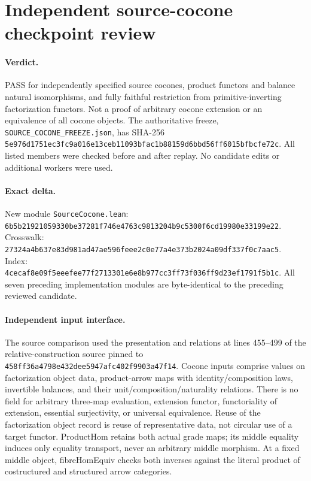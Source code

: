 \documentclass{article}
\begin{document}
\section*{Independent source-cocone checkpoint review}
\paragraph{Verdict.} PASS for independently specified source cocones, product functors and balance natural isomorphisms, and fully faithful restriction from primitive-inverting factorization functors. Not a proof of arbitrary cocone extension or an equivalence of all cocone objects. The authoritative freeze, \texttt{SOURCE\_COCONE\_FREEZE.json}, has SHA-256 \texttt{5e976d1751ec3fc9a016e13ceb11093bfac1b88159d6bbd56ff6015bfbcfe72c}. All listed members were checked before and after replay. No candidate edits or additional workers were used.
\paragraph{Exact delta.} New module \texttt{SourceCocone.lean}: \texttt{6b5b21921059330be37281f746e4763c9813204b9c5300f6cd19980e33199e22}. Crosswalk: \texttt{27324a4b637e83d981ad47ae596feee2c0e77a4e373b2024a09df337f0c7aac5}. Index: \texttt{4cecaf8e09f5eeefee77f2713301e6e8b977cc3ff73f036ff9d23ef1791f5b1c}. All seven preceding implementation modules are byte-identical to the preceding reviewed candidate.
\paragraph{Independent input interface.} The source comparison used the presentation and relations at lines 455--499 of the relative-construction source pinned to \texttt{458ff36a4798e432dee5947afc402f9903a47f14}. Cocone inputs comprise values on factorization object data, product-arrow maps with identity/composition laws, invertible balances, and their unit/composition/naturality relations. There is no field for arbitrary three-map evaluation, extension functor, functoriality of extension, essential surjectivity, or universal equivalence. Reuse of the factorization object record is reuse of representative data, not circular use of a target functor. ProductHom retains both actual grade maps; its middle equality induces only equality transport, never an arbitrary middle morphism. At a fixed middle object, fibreHomEquiv checks both inverses against the literal product of costructured and structured arrow categories.
\end{document}
